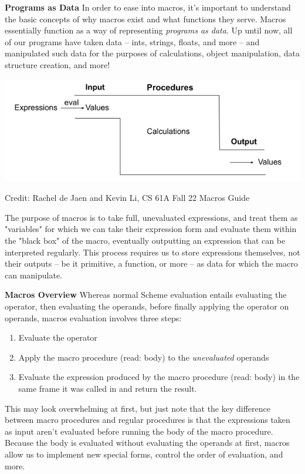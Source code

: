 \textbf{Programs as Data} 
In order to ease into macros, it's important to understand the basic concepts of why macros exist and what functions they serve.
Macros essentially function as a way of representing \textit{programs as data}.
Up until now, all of our programs have taken data -- ints, strings, floats, and more -- and manipulated such data for the purposes of calculations, object manipulation, data structure creation, and more!

\includegraphics{macro_black_box.png}
\caption{Credit: Rachel de Jaen and Kevin Li, CS 61A Fall 22 Macros Guide}

The purpose of macros is to take full, unevaluated expressions, and treat them as "variables" for which we can take their expression form and evaluate them within the "black box" of the macro, eventually outputting an expression that can be interpreted regularly.
This process requires us to store expressions themselves, not their outputs -- be it primitive, a function, or more -- as data for which the macro can manipulate.

\newpage
\textbf{Macros Overview} Whereas normal Scheme evaluation entails evaluating the operator, then evaluating the operands, before finally applying the operator on operands, macros evaluation involves three steps:

\begin{enumerate}[1.]
\item Evaluate the operator
\item Apply the macro procedure (read: body) to the \textit{unevaluated} operands
\item Evaluate the expression produced by the macro procedure (read: body) in the same frame it was called in and return the result.
\end{enumerate}

This may look overwhelming at first, but just note that the key difference between macro procedures and regular procedures is that the expressions taken as input aren't evaluated before running the body of the macro procedure.
Because the body is evaluated without evaluating the operands at first, macros allow us to implement new special forms, control the order of evaluation, and more. 

